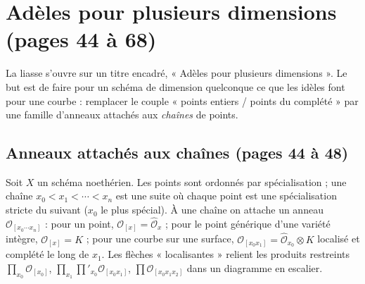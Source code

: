 \documentclass[11pt,a4paper]{article}
\begin{document}
\section*{Adèles pour plusieurs dimensions (pages 44 à 68)}

La liasse s'ouvre sur un titre encadré, « Adèles pour plusieurs dimensions ». Le
but est de faire pour un schéma de dimension quelconque ce que les idèles font
pour une courbe : remplacer le couple « points entiers / points du complété »
par une famille d'anneaux attachés aux \emph{chaînes} de points.

\subsection*{Anneaux attachés aux chaînes (pages 44 à 48)}

Soit $X$ un schéma noethérien. Les points sont ordonnés par spécialisation ; une
chaîne $x_0 < x_1 < \cdots < x_n$ est une suite où chaque point est une
spécialisation stricte du suivant ($x_0$ le plus spécial). À une chaîne on
attache un anneau $\mathcal{O}_{[x_0 \cdots x_n]}$ : pour un point,
$\mathcal{O}_{[x]} = \hat{\mathcal{O}}_x$ ; pour le point générique d'une variété
intègre, $\mathcal{O}_{[x]} = K$ ; pour une courbe sur une surface,
$\mathcal{O}_{[x_0 x_1]} = \hat{\mathcal{O}}_{x_0} \otimes K$ localisé et complété le
long de $x_1$. Les flèches « localisantes » relient les produits restreints
$\prod_{x_0}\mathcal{O}_{[x_0]}$, $\prod_{x_1}\prod'_{x_0}\mathcal{O}_{[x_0 x_1]}$,
$\prod\mathcal{O}_{[x_0 x_1 x_2]}$ dans un diagramme en escalier.
\end{document}
